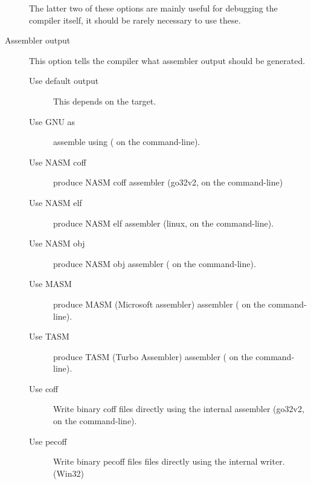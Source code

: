 \begin{description}
The latter two of these options are mainly useful for debugging the
compiler itself, it should be rarely necessary to use these.
\item[Assembler output] This option tells the compiler what assembler output
should be generated.
\begin{description}
\item[Use default output] This depends on the target.
\item[Use GNU as] assemble using \gnu {} ( on the
command-line).
\item[Use NASM coff] produce NASM coff assembler (go32v2,  on the
command-line)
\item[Use NASM elf] produce NASM elf assembler (linux,  on
the command-line).
\item[Use NASM obj] produce NASM obj assembler ( on the
command-line).
\item[Use MASM] produce MASM (Microsoft assembler) assembler ( on the
command-line).
\item[Use TASM] produce TASM (Turbo Assembler) assembler ( on the
command-line).
\item[Use coff] Write binary coff files directly using the internal
assembler (go32v2,  on the command-line).
\item[Use pecoff] Write binary pecoff files files directly using the
internal writer. (Win32)
\end{description}
\end{description}
%
%
